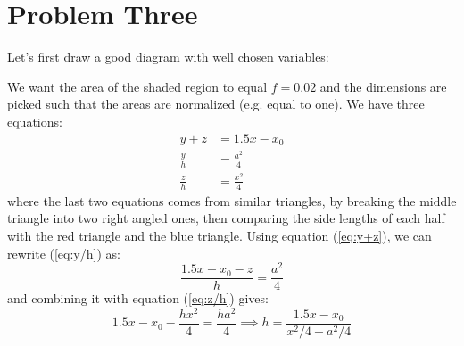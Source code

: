 \documentclass{article}
\begin{document}
\section{Problem Three}
Let's first draw a good diagram with well chosen variables:
\begin{center}
\end{center}
We want the area of the shaded region to equal $f=0.02$ and the dimensions are picked such that the areas are normalized (e.g. equal to one). We have three equations:
\begin{align}
    y+z&=1.5x-x_0 \label{eq:y+z} \\ 
    \frac{y}{h}&=\frac{a^2}{4} \label{eq:y/h} \\ 
    \frac{z}{h}&=\frac{x^2}{4} \label{eq:z/h}
\end{align}
where the last two equations comes from similar triangles, by breaking the middle triangle into two right angled ones, then comparing the side lengths of each half with the red triangle and the blue triangle. Using equation (\ref{eq:y+z}), we can rewrite (\ref{eq:y/h}) as:
\begin{equation}
    \frac{1.5x-x_0-z}{h}=\frac{a^2}{4}
    \label{eq:}
\end{equation}
and combining it with equation (\ref{eq:z/h}) gives:
\begin{equation}
    1.5x-x_0-\frac{hx^2}{4}=\frac{ha^2}{4} \implies h = \frac{1.5x-x_0}{x^2/4+a^2/4}
    \label{eq:}
\end{equation}
\end{document}
